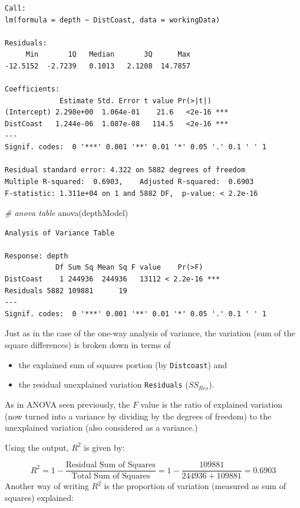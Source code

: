 \documentclass[
  oneside]{krantz}
\newenvironment{Shaded}{\begin{snugshade}}{\end{snugshade}}
\newcommand{\CommentTok}[1]{\textcolor[rgb]{0.56,0.35,0.01}{\textit{#1}}}
\newcommand{\FunctionTok}[1]{\textcolor[rgb]{0.00,0.00,0.00}{#1}}
\newcommand{\NormalTok}[1]{#1}
\providecommand{\tightlist}{%
  \setlength{\itemsep}{0pt}\setlength{\parskip}{0pt}}
\begin{document}
\begin{verbatim}
Call:
lm(formula = depth ~ DistCoast, data = workingData)

Residuals:
     Min       1Q   Median       3Q      Max 
-12.5152  -2.7239   0.1013   2.1208  14.7857 

Coefficients:
             Estimate Std. Error t value Pr(>|t|)    
(Intercept) 2.298e+00  1.064e-01    21.6   <2e-16 ***
DistCoast   1.244e-06  1.087e-08   114.5   <2e-16 ***
---
Signif. codes:  0 '***' 0.001 '**' 0.01 '*' 0.05 '.' 0.1 ' ' 1

Residual standard error: 4.322 on 5882 degrees of freedom
Multiple R-squared:  0.6903,    Adjusted R-squared:  0.6903 
F-statistic: 1.311e+04 on 1 and 5882 DF,  p-value: < 2.2e-16
\end{verbatim}

\begin{Shaded}
\begin{Highlighting}[]
\CommentTok{\# anova table}
\FunctionTok{anova}\NormalTok{(depthModel)}
\end{Highlighting}
\end{Shaded}

\begin{verbatim}
Analysis of Variance Table

Response: depth
            Df Sum Sq Mean Sq F value    Pr(>F)    
DistCoast    1 244936  244936   13112 < 2.2e-16 ***
Residuals 5882 109881      19                      
---
Signif. codes:  0 '***' 0.001 '**' 0.01 '*' 0.05 '.' 0.1 ' ' 1
\end{verbatim}

Just as in the case of the one-way analysis of variance, the variation (sum of the square differences) is broken down in terms of

\begin{itemize}
\tightlist
\item
  the explained sum of squares portion (by \texttt{Distcoast}) and
\item
  the residual unexplained variation \texttt{Residuals} (\(SS_{Res}\)).
\end{itemize}

As in ANOVA seen previously, the \(F\) value is the ratio of explained variation (now turned into a variance by dividing by the degrees of freedom) to the unexplained variation (also considered as a variance.)

Using the output, \(R^2\) is given by:

\[R^2 = 1- \frac{\textrm{Residual Sum of Squares}}{\textrm{Total Sum of Squares}} = 1- \frac{109881}{244936+109881} = 0.6903\]
Another way of writing \(R^2\) is the proportion of variation (measured as sum of squares) explained:
\end{document}
